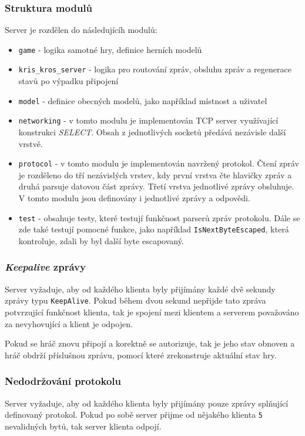 \documentclass[12pt, a4paper]{article}
\begin{document}
		    \subsubsection{Struktura modulů}
			Server je rozdělen do následujícíh modulů:
			\begin{itemize}
				\item \texttt{game} - logika samotné hry, definice herních modelů
				\item \texttt{kris\_kros\_server} - logika pro routování zpráv, obsluhu zpráv a regenerace stavů po výpadku připojení
				\item \texttt{model} - definice obecných modelů, jako například místnost a uživatel
				\item \texttt{networking} - v tomto modulu je implementován TCP server využívající konstrukci \textit{SELECT}. Obsah z jednotlivých socketů předává nezávisle další vrstvě.
				\item \texttt{protocol} - v tomto modulu je implementován navržený protokol. Čtení zpráv je rozděleno do tří nezávislých vrstev, kdy první vrstva čte hlavičky zpráv a druhá parsuje datovou část zprávy. Třetí vrstva jednotlivé zprávy obsluhuje. V tomto modulu jsou definovány i jednotlivé zprávy a odpovědi.
				\item \texttt{test} - obsahuje testy, které testují funkčnost parserů zpráv protokolu. Dále se zde také testují pomocné funkce, jako například \texttt{IsNextByteEscaped}, která kontroluje, zdali by byl další byte escapovaný.
			\end{itemize}
			
			\subsubsection{\textit{Keepalive} zprávy}
			Server vyžaduje, aby od každého klienta byly přijímány každé dvě sekundy zprávy typu \texttt{KeepAlive}. Pokud během dvou sekund nepřijde tato zpráva potvrzující funkčnost klienta, tak je spojení mezi klientem a serverem považováno za nevyhovující a klient je odpojen.
	
	Pokud se hráč znovu připojí a korektně se autorizuje, tak je jeho stav obnoven a hráč obdrží příslušnou zprávu, pomocí které zrekonstruje aktuální stav hry.
			
			\subsubsection{Nedodržování protokolu}
			Server vyžaduje, aby od každého klienta byly přijímány pouze zprávy splňující definovaný protokol. Pokud po sobě server přijme od nějakého klienta \texttt{5} nevalidných bytů, tak server klienta odpojí.
\end{document}

